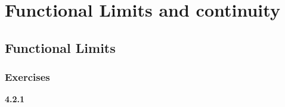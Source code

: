 \section{Functional Limits and continuity}

\subsection{Functional Limits}

\subsubsection{Exercises}

\textbf{4.2.1}
\\

